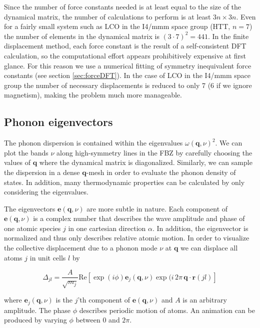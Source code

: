 Since the number of force constants needed is at least equal to the size of the dynamical matrix, the number of calculations to perform is at least $3n \times 3n$. Even for a fairly small system such as LCO in the I4/mmm space group (HTT, $n=7$) the number of elements in the dynamical matrix is $(3\cdot 7)^2 = 441$. In the finite displacement method, each force constant is the result of a self-consistent DFT calculation, so the computational effort appears prohibitively expensive at first glance. For this reason we use a numerical fitting of symmetry inequivalent force constants (see section \ref{sec:forceDFT}). In the case of LCO in the I4/mmm space group the number of necessary displacements is reduced to only 7 (6 if we ignore magnetism), making the problem much more manageable.

\subsection{Phonon eigenvectors}
The phonon dispersion is contained within the eigenvalues $\omega (\bm{q},\nu)^2$. We can plot the bands $\nu$ along high-symmetry lines in the FBZ by carefully choosing the values of $\bm{q}$ where the dynamical matrix is diagonalized. Similarly, we can sample the dispersion in a dense $\bm{q}$-mesh in order to evaluate the phonon density of states. In addition, many thermodynamic properties can be calculated by only considering the eigenvalues.

The eigenvectors $\bm{e}(\bm{q}, \nu)$ are more subtle in nature. Each component of  $\bm{e}(\bm{q}, \nu)$ is a complex number that describes the wave amplitude and phase of one atomic species $j$ in one cartesian direction $\alpha$. In addition, the eigenvector is normalized and thus only describes relative atomic motion. In order to visualize the collective displacement due to a phonon mode $\nu$ at $\bm{q}$ we can displace all atoms $j$ in unit cells $l$ by

\begin{equation}
\Delta_{jl} = \frac{A}{\sqrt{m_j}} \text{Re} \left[ \exp (i\phi) \bm{e}_j(\bm{q}, \nu) \exp (i \, 2 \pi \, \bm{q} \cdot \bm{r}(jl) \right] \label{eq:displacements}
\end{equation}

\noindent where $\bm{e}_j(\bm{q}, \nu)$ is the $j$'th component of $\bm{e}(\bm{q}, \nu)$ and $A$ is an arbitrary amplitude. The phase $\phi$ describes periodic motion of atoms. An animation can be produced by varying $\phi$ between 0 and $2 \pi$.

